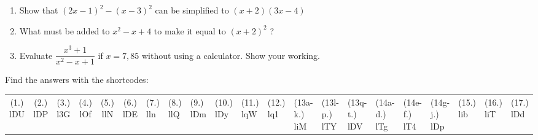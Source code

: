 \begin{eocexercises}{}
\begin{enumerate}[itemsep=5pt, label=\textbf{\arabic*}. ]
\item Show that ${(2x-1)}^{2}-{(x-3)}^{2}$ can be simplified to $(x+2)(3x-4)$

\item What must be added to ${x}^{2}-x+4$ to make it equal to ${(x+2)}^{2}$ ?
\item Evaluate $\dfrac{x^{3}+1}{x^{2}-x+1}$ if $x=7,85$ without using a calculator. Show your working.
\end{enumerate}
\practiceinfo 
\par {} Find the answers with the shortcodes:
 \par \begin{tabular}[h]{cccccc}
 (1.) lDU  &  (2.) lDP  &  (3.) l3G  & (4.) lOf & (5.) llN & (6.) lDE &
 (7.) lln  &  (8.) llQ  &  (9.) lDm  & (10.) lDy & (11.) lqW & (12.) lq1 &
 (13a-k.)  liM  &  (13l-p.) lTY  &  (13q-t.) lDV  & (14a-d.) lTg & (14e-f.) lT4 & (14g-j.) lDp &
 (15.) lib  &  (16.) liT  &  (17.) lDd    \end{tabular}
\end{eocexercises}
